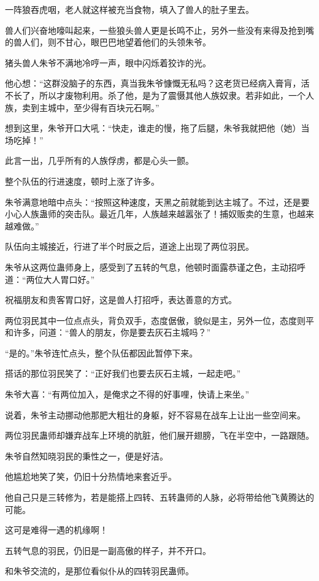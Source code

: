 \begin{this_body}
一阵狼吞虎咽，老人就这样被充当食物，填入了兽人的肚子里去。

兽人们兴奋地嚎叫起来，一些狼头兽人更是长鸣不止，另外一些没有来得及抢到嘴的兽人们，则不甘心，眼巴巴地望着他们的头领朱爷。

猪头兽人朱爷不满地冷哼一声，眼中闪烁着狡诈的光。

他心想：“这群没脑子的东西，真当我朱爷慷慨无私吗？这老货已经病入膏肓，活不长了，所以才废物利用。杀了他，是为了震慑其他人族奴隶。若非如此，一个人族，卖到主城中，至少得有百块元石啊。”

想到这里，朱爷开口大吼：“快走，谁走的慢，拖了后腿，朱爷我就把他（她）当场吃掉！”

此言一出，几乎所有的人族俘虏，都是心头一颤。

整个队伍的行进速度，顿时上涨了许多。

朱爷满意地暗中点头：“按照这种速度，天黑之前就能到达主城了。不过，还是要小心人族蛊师的突击队。最近几年，人族越来越嚣张了！捕奴贩卖的生意，也越来越难做。”

队伍向主城接近，行进了半个时辰之后，道途上出现了两位羽民。

朱爷从这两位蛊师身上，感受到了五转的气息，他顿时面露恭谨之色，主动招呼道：“两位大人胃口好。”

祝福朋友和贵客胃口好，这是兽人打招呼，表达善意的方式。

两位羽民其中一位点点头，背负双手，态度倨傲，貌似是主，另外一位，态度则平和许多，问道：“兽人的朋友，你是要去灰石主城吗？”

“是的。”朱爷连忙点头，整个队伍都因此暂停下来。

搭话的那位羽民笑了：“正好我们也要去灰石主城，一起走吧。”

朱爷大喜：“有两位加入，是俺求之不得的好事哩，快请上来坐。”

说着，朱爷主动挪动他那肥大粗壮的身躯，好不容易在战车上让出一些空间来。

两位羽民蛊师却嫌弃战车上环境的肮脏，他们展开翅膀，飞在半空中，一路跟随。

朱爷自然知晓羽民的秉性之一，便是好洁。

他尴尬地笑了笑，仍旧十分热情地来套近乎。

他自己只是三转修为，若是能搭上四转、五转蛊师的人脉，必将带给他飞黄腾达的可能。

这可是难得一遇的机缘啊！

五转气息的羽民，仍旧是一副高傲的样子，并不开口。

和朱爷交流的，是那位看似仆从的四转羽民蛊师。


\end{this_body}
